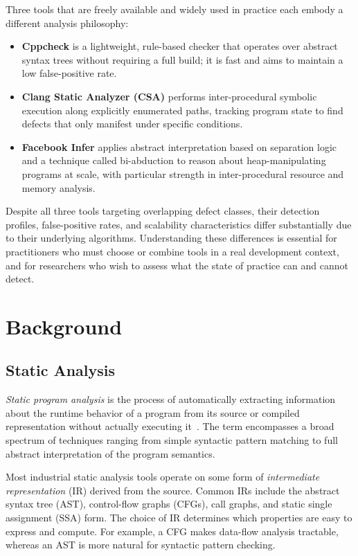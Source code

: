\documentclass[11pt,a4paper]{article}
\begin{document}
Three tools that are freely available and widely used in practice each embody a different analysis philosophy:

\begin{itemize}  
	\item \textbf{Cppcheck} is a lightweight, rule-based checker that operates over abstract syntax trees without requiring a full build; it is fast and aims to maintain a low false-positive rate.  
	\item \textbf{Clang Static Analyzer (CSA)} performs inter-procedural symbolic execution along explicitly enumerated paths, tracking program state to find  defects that only manifest under specific conditions.  
	\item \textbf{Facebook Infer} applies abstract interpretation based on separation logic and a technique called bi-abduction to reason about heap-manipulating programs at scale, with particular strength in inter-procedural resource and memory analysis.
\end{itemize}

Despite all three tools targeting overlapping defect classes, their detection profiles, false-positive rates, and scalability characteristics differ substantially due to their underlying algorithms. Understanding these differences is essential for practitioners who must choose or combine tools in a real development context, and for researchers who wish to assess what the state of practice can and cannot detect.

\section{Background} 
\label{sec:background}

\subsection{Static Analysis}

\emph{Static program analysis} is the process of automatically extracting information about the runtime behavior of a program from its source or compiled representation without actually executing it~\cite{nielson1999principles}. The term encompasses a broad spectrum of techniques ranging from simple syntactic pattern matching to full abstract interpretation of the program semantics.

Most industrial static analysis tools operate on some form of \emph{intermediate representation} (IR) derived from the source. Common IRs include the abstract syntax tree (AST), control-flow graphs (CFGs), call graphs, and static single assignment (SSA) form. The choice of IR determines which properties are easy to express and compute. For example, a CFG makes data-flow analysis tractable, whereas an AST is more natural for syntactic pattern checking.
\end{document}
